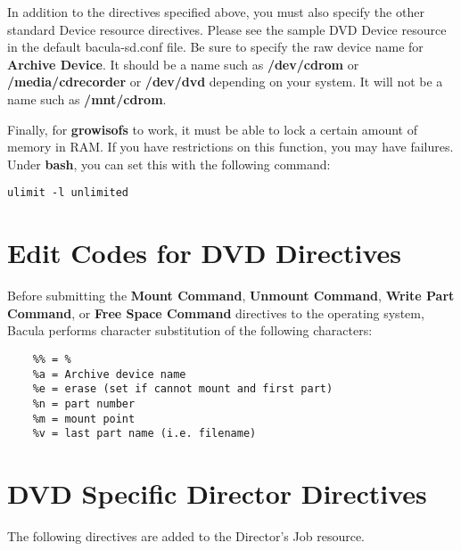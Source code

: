 In addition to the directives specified above, you must also
specify the other standard Device resource directives. Please see the
sample DVD Device resource in the default bacula-sd.conf file. Be sure
to specify the raw device name for {\bf Archive Device}. It should 
be a name such as {\bf /dev/cdrom} or {\bf /media/cdrecorder} or
{\bf /dev/dvd} depending on your system.  It will not be a name such
as {\bf /mnt/cdrom}.

Finally, for {\bf growisofs} to work, it must be able to lock
a certain amount of memory in RAM.  If you have restrictions on
this function, you may have failures.  Under {\bf bash}, you can
set this with the following command:

\footnotesize  
\begin{verbatim}
ulimit -l unlimited
\end{verbatim}
\normalsize

\section{Edit Codes for DVD Directives} 

Before submitting the {\bf Mount Command}, {\bf Unmount Command}, 
{\bf Write Part Command}, or {\bf Free Space Command} directives 
to the operating system, Bacula performs character substitution of the
following characters:

\footnotesize
\begin{verbatim}
    %% = %
    %a = Archive device name
    %e = erase (set if cannot mount and first part)
    %n = part number
    %m = mount point
    %v = last part name (i.e. filename)
\end{verbatim}
\normalsize



\section{DVD Specific Director Directives} 

The following directives are added to the Director's Job resource.
    
